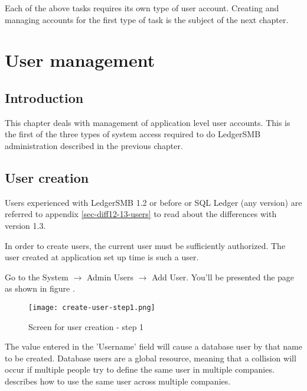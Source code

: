 Each of the above tasks requires its own type of user account. Creating and managing accounts
for the first type of task is the subject of the next chapter.




\chapter{User management}
\label{cha-user-management}

\section{Introduction}
\label{sec-user-management-introduction}

This chapter deals with management of application level user accounts. This is the first
of the three types of system access required to do LedgerSMB administration described in
the previous chapter.

\section{User creation}
\label{sec-user-creation}

Users experienced with LedgerSMB 1.2 or before or SQL Ledger (any version) are
referred to appendix \ref{sec-diff12-13-users} to read about the differences
with version 1.3.

In order to create users, the current user must be sufficiently authorized. The user
created at application set up time is such a user.

Go to the System $\rightarrow$ Admin Users $\rightarrow$ Add User. You'll be presented the page as shown in figure .

\begin{figure}[h]
\texttt{[image: create-user-step1.png]}
\caption{Screen for user creation - step 1}
\end{figure}
\label{fig:create-user-step1}

The value entered in the 'Username' field will cause a database user by that name
to be created. Database users are a global resource, meaning that a collision will
occur if multiple people try to define the same user in multiple companies.
 describes how to use the same user across multiple companies.

